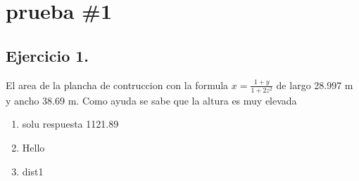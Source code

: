 \documentclass{article}%
\begin{document}
%
\normalsize%
\section*{prueba \#1}%
\subsection*{Ejercicio 1.}%
El area de la plancha de contruccion con la formula $x=\frac{1+y}{1+2z^2}$ de largo 28.997 m y ancho 38.69 m.\linebreak 
\linebreak 
\linebreak 
Como ayuda se sabe que la altura es muy elevada%
\begin{enumerate}[label=\alph*)]%
\item%
solu respuesta 1121.89%
\item%
Hello%
\item%
dist1%
\end{enumerate}

%
\end{document}
